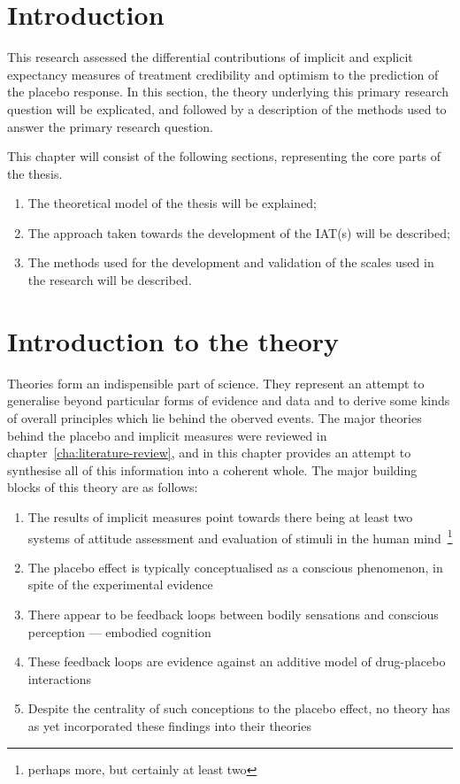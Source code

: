 
\section{Introduction}

This research assessed the differential contributions of implicit and explicit expectancy measures of treatment credibility and optimism to the prediction of the placebo response. 
In this section, the theory underlying this primary research question will be explicated, and followed by a description of the methods used to answer the primary research question. 


This chapter will consist of the following sections, representing the core parts of the thesis.

\begin{enumerate}
\item The theoretical model of the thesis will be explained;
\item The approach taken towards the development of the IAT(s) will be described;
\item The methods used for the development and validation of the scales used in the research will be described.
\end{enumerate}

\section{Introduction to the theory}

Theories form an indispensible part of science. They represent an attempt to generalise beyond particular forms of evidence and data and to derive some kinds of overall principles which lie behind the oberved events. The major theories behind the placebo and implicit measures were reviewed in  chapter~\ref{cha:literature-review}, and in this chapter provides  an attempt to synthesise all of this information into a coherent whole. The major building blocks of this theory are as follows:
\begin{enumerate}
\item The results of implicit measures point towards there being at least two systems of attitude assessment and evaluation of stimuli in the human mind~\footnote{perhaps more, but certainly at least two}
\item The placebo effect is typically conceptualised as a conscious phenomenon, in spite of the experimental evidence
\item There appear to be feedback loops between bodily sensations and conscious perception --- embodied cognition
\item These feedback loops are evidence against an additive model of drug-placebo interactions
\item Despite the centrality of such conceptions to the placebo effect, no theory has as yet incorporated these findings into their theories
\end{enumerate}

